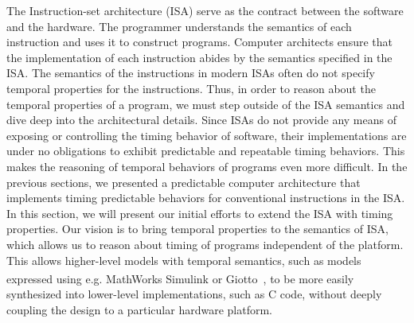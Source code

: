 
The Instruction-set architecture (ISA) serve as the contract between the software and the hardware.
The programmer understands the semantics of each instruction and uses it to construct programs.
Computer architects ensure that the implementation of each instruction abides by the semantics specified in the ISA.
The semantics of the instructions in modern ISAs often do not specify temporal properties for the instructions.   
Thus, in order to reason about the temporal properties of a program, we must step outside of the ISA semantics and dive deep into the architectural details.
Since ISAs do not provide any means of exposing or controlling the timing behavior of software, their implementations are under no obligations to exhibit predictable and repeatable timing behaviors.
This makes the reasoning of temporal behaviors of programs even more difficult.  
In the previous sections, we presented a predictable computer architecture that implements timing predictable behaviors for conventional instructions in the ISA. 
In this section, we will present our initial efforts to extend the ISA with timing properties.  
Our vision is to bring temporal properties to the semantics of ISA, which allows us to reason about timing of programs independent of the platform.
This allows higher-level models with temporal semantics, such as models expressed using e.g. MathWorks Simulink\textsuperscript{\textregistered} or Giotto~\cite{henzinger_giotto}, to be more easily synthesized into lower-level implementations, such as C code, without deeply coupling the design to a particular hardware platform. 

